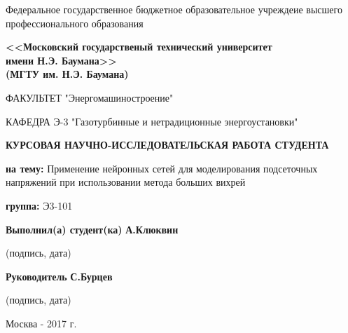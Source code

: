 \documentclass[14pt]{extarticle}
\begin{document}
\begin{titlepage}	%
	\begin{center}
	{ Федеральное государственное бюджетное образовательное учреждеие высшего профессионального образования \\}
	\end{center}


   \begin{minipage}{0.80\textwidth}
		\begin{large}
			\begin{center}
				{
		\textbf{<<Московский государственый технический университет \\ имени Н.Э. Баумана>> \\ (МГТУ им. Н.Э. Баумана) \\}
   				}
			\end{center}
   		\end{large}
	\end{minipage}

   \begin{center}
    \vspace{0.25cm}
	\noindent\makebox[\linewidth]{\rule{\textwidth}{0.4pt}}

    ФАКУЛЬТЕТ "Энергомашиностроение"

    КАФЕДРА Э-3 "Газотурбинные и нетрадиционные энергоустановки"
    \vspace{1cm}


    \begin{large}\textbf{КУРСОВАЯ НАУЧНО-ИССЛЕДОВАТЕЛЬСКАЯ РАБОТА СТУДЕНТА}\end{large}

	\end{center}
    \textbf{на тему:} Применение нейронных сетей для моделирования подсеточных напряжений при использовании метода больших вихрей

    \textbf{группа:} Э3-101

    \begin{small}\textbf{Выполнил(а) студент(ка)} \makebox[9cm]{\hrulefill}  \textbf{А.Клюквин} \\
    \centerline{(подпись, дата)}
    \end{small}

    \begin{small}\textbf{Руководитель} \makebox[11.8cm]{\hrulefill}   \textbf{С.Бурцев} \\
    \centerline{(подпись, дата)}
    \end{small}



\vfill

\begin{center}
  Москва - 2017 г.
\end{center}
\end{titlepage}








\end{document}
